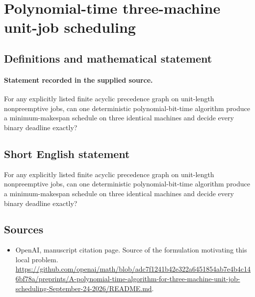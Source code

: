 \documentclass[11pt]{article}
\begin{document}
\section*{Polynomial-time three-machine unit-job scheduling}\label{statement}
\subsection{Definitions and mathematical statement}
\paragraph{Statement recorded in the supplied source.}
For any explicitly listed finite acyclic precedence graph on unit-length nonpreemptive jobs, can one deterministic polynomial-bit-time algorithm produce a minimum-makespan schedule on three identical machines and decide every binary deadline exactly?
\subsection{Short English statement}
For any explicitly listed finite acyclic precedence graph on unit-length nonpreemptive jobs, can one deterministic polynomial-bit-time algorithm produce a minimum-makespan schedule on three identical machines and decide every binary deadline exactly?
\subsection{Sources}
\begin{itemize}
\item[S1] OpenAI, manuscript citation page. Source of the formulation motivating this local problem.
\url{https://github.com/openai/math/blob/adc7f1241b42e322a6451854ab7e4b4c146bf78a/preprints/A-polynomial-time-algorithm-for-three-machine-unit-job-scheduling-September-24-2026/README.md}.
\end{itemize}
\end{document}
